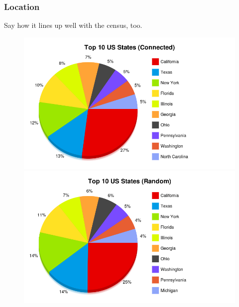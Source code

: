 \subsubsection{Location}

Say how it lines up well with the census, too.

\begin{figure}[t]
 \centering
 \includegraphics[bb=0 0 800 500,scale=.2]{./images/loca-conn.png}
\caption{}

 \includegraphics[bb=0 0 800 500,scale=.2]{./images/loca-rand.png}
\caption{}


\end{figure}
